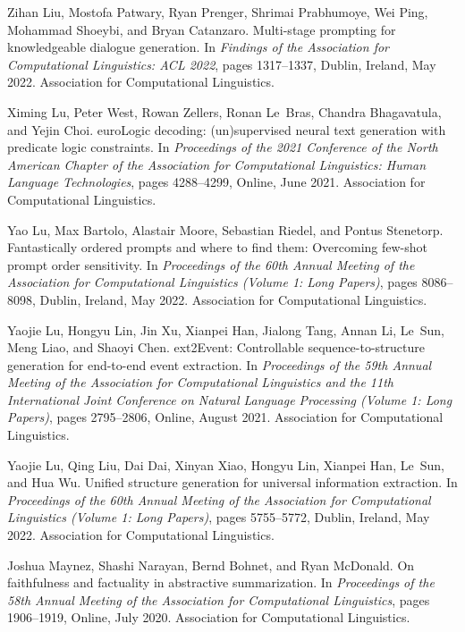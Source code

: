 \documentclass[11pt]{article}
\begin{document}
\begin{thebibliography}{100}
Zihan Liu, Mostofa Patwary, Ryan Prenger, Shrimai Prabhumoye, Wei Ping,
  Mohammad Shoeybi, and Bryan Catanzaro.
\newblock Multi-stage prompting for knowledgeable dialogue generation.
\newblock In {\em Findings of the Association for Computational Linguistics:
  ACL 2022}, pages 1317--1337, Dublin, Ireland, May 2022. Association for
  Computational Linguistics.

Ximing Lu, Peter West, Rowan Zellers, Ronan Le~Bras, Chandra Bhagavatula, and
  Yejin Choi.
euro{L}ogic decoding: (un)supervised neural text generation with
  predicate logic constraints.
\newblock In {\em Proceedings of the 2021 Conference of the North American
  Chapter of the Association for Computational Linguistics: Human Language
  Technologies}, pages 4288--4299, Online, June 2021. Association for
  Computational Linguistics.

Yao Lu, Max Bartolo, Alastair Moore, Sebastian Riedel, and Pontus Stenetorp.
\newblock Fantastically ordered prompts and where to find them: Overcoming
  few-shot prompt order sensitivity.
\newblock In {\em Proceedings of the 60th Annual Meeting of the Association for
  Computational Linguistics (Volume 1: Long Papers)}, pages 8086--8098, Dublin,
  Ireland, May 2022. Association for Computational Linguistics.

Yaojie Lu, Hongyu Lin, Jin Xu, Xianpei Han, Jialong Tang, Annan Li, Le~Sun,
  Meng Liao, and Shaoyi Chen.
ext2{E}vent: Controllable sequence-to-structure generation for
  end-to-end event extraction.
\newblock In {\em Proceedings of the 59th Annual Meeting of the Association for
  Computational Linguistics and the 11th International Joint Conference on
  Natural Language Processing (Volume 1: Long Papers)}, pages 2795--2806,
  Online, August 2021. Association for Computational Linguistics.

Yaojie Lu, Qing Liu, Dai Dai, Xinyan Xiao, Hongyu Lin, Xianpei Han, Le~Sun, and
  Hua Wu.
\newblock Unified structure generation for universal information extraction.
\newblock In {\em Proceedings of the 60th Annual Meeting of the Association for
  Computational Linguistics (Volume 1: Long Papers)}, pages 5755--5772, Dublin,
  Ireland, May 2022. Association for Computational Linguistics.

Joshua Maynez, Shashi Narayan, Bernd Bohnet, and Ryan McDonald.
\newblock On faithfulness and factuality in abstractive summarization.
\newblock In {\em Proceedings of the 58th Annual Meeting of the Association for
  Computational Linguistics}, pages 1906--1919, Online, July 2020. Association
  for Computational Linguistics.


\end{thebibliography}
\end{document}
